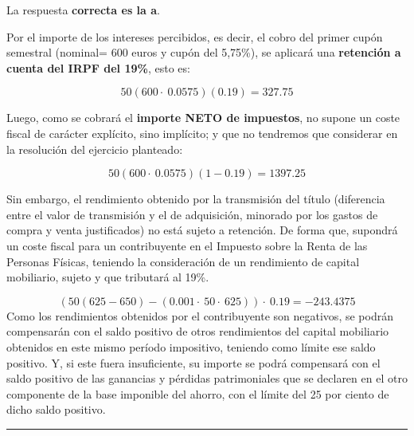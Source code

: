 \documentclass[
  letterpaper,
  DIV=11,
  numbers=noendperiod]{scrartcl}
\begin{document}
\begin{tcolorbox}[enhanced jigsaw, colframe=quarto-callout-tip-color-frame, opacityback=0, opacitybacktitle=0.6, colback=white, leftrule=.75mm, bottomtitle=1mm, colbacktitle=quarto-callout-tip-color!10!white, coltitle=black, toprule=.15mm, left=2mm, breakable, toptitle=1mm, titlerule=0mm, title=\textcolor{quarto-callout-tip-color}{\faLightbulb}\hspace{0.5em}{Solución}, arc=.35mm, rightrule=.15mm, bottomrule=.15mm]

La respuesta \textbf{correcta es la a}.

Por el importe de los intereses percibidos, es decir, el cobro del
primer cupón semestral (nominal= 600 euros y cupón del 5,75\%), se
aplicará una \textbf{retención a cuenta del IRPF del 19\%}, esto es:

\[50\left(600\cdot \:0.0575\right)\left(0.19\right)=327.75\]

Luego, como se cobrará el \textbf{importe NETO de impuestos}, no supone
un coste fiscal de carácter explícito, sino implícito; y que no
tendremos que considerar en la resolución del ejercicio planteado:

\[50\left(600\cdot \:0.0575\right)\left(1-0.19\right)=1397.25\]

Sin embargo, el rendimiento obtenido por la transmisión del título
(diferencia entre el valor de transmisión y el de adquisición, minorado
por los gastos de compra y venta justificados) no está sujeto a
retención. De forma que, supondrá un coste fiscal para un contribuyente
en el Impuesto sobre la Renta de las Personas Físicas, teniendo la
consideración de un rendimiento de capital mobiliario, sujeto y que
tributará al 19\%.

\[\left(50\left(625-650\right)-\left(0.001\cdot \:50\cdot \:625\right)\right)\cdot \:0.19=-243.4375\]
Como los rendimientos obtenidos por el contribuyente son negativos, se
podrán compensarán con el saldo positivo de otros rendimientos del
capital mobiliario obtenidos en este mismo período impositivo, teniendo
como límite ese saldo positivo. Y, si este fuera insuficiente, su
importe se podrá compensará con el saldo positivo de las ganancias y
pérdidas patrimoniales que se declaren en el otro componente de la base
imponible del ahorro, con el límite del 25 por ciento de dicho saldo
positivo.

\end{tcolorbox}

\begin{center}\rule{0.5\linewidth}{0.5pt}\end{center}
\end{document}
